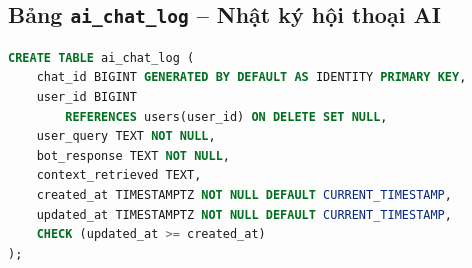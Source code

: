 \subsection{Bảng \texttt{ai\_chat\_log} -- Nhật ký hội thoại AI}
\label{physical-ai_chat_log}
\begin{lstlisting}[language=SQL,breaklines=true,basicstyle=\ttfamily\scriptsize]
CREATE TABLE ai_chat_log (
    chat_id BIGINT GENERATED BY DEFAULT AS IDENTITY PRIMARY KEY,
    user_id BIGINT
        REFERENCES users(user_id) ON DELETE SET NULL,
    user_query TEXT NOT NULL,
    bot_response TEXT NOT NULL,
    context_retrieved TEXT,
    created_at TIMESTAMPTZ NOT NULL DEFAULT CURRENT_TIMESTAMP,
    updated_at TIMESTAMPTZ NOT NULL DEFAULT CURRENT_TIMESTAMP,
    CHECK (updated_at >= created_at)
);
\end{lstlisting}

